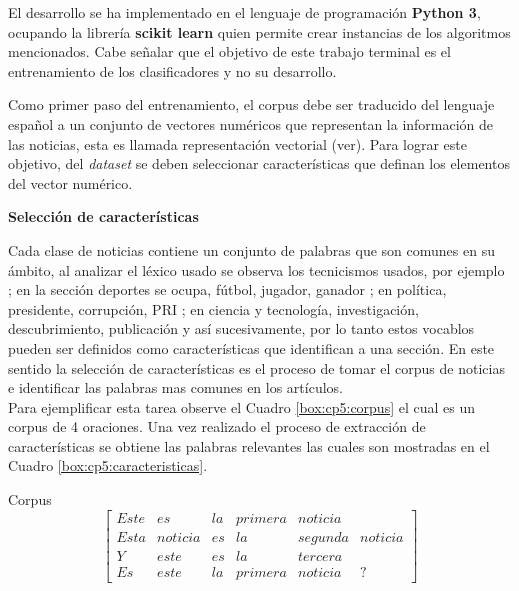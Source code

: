 El desarrollo se ha implementado en el lenguaje de programación \textbf{Python 3}, ocupando la librería \textbf{scikit learn} quien permite crear instancias de los algoritmos mencionados. Cabe señalar que el objetivo de este trabajo terminal es el entrenamiento de los clasificadores y no su desarrollo.

Como primer paso del entrenamiento, el corpus debe ser traducido del lenguaje español a un conjunto de vectores numéricos que representan la información de las noticias, esta es llamada representación vectorial (ver). Para lograr este objetivo, del \textit{dataset} se deben seleccionar características que definan los elementos del vector numérico.\\

\begin{large}
\textbf{Selección de características}\\
\end{large}

Cada clase de noticias contiene un conjunto de palabras que son comunes en su ámbito, al analizar el léxico usado se observa los tecnicismos usados, por ejemplo ; en la sección deportes se ocupa, fútbol, jugador, ganador ; en política, presidente, corrupción, PRI ; en ciencia y tecnología, investigación, descubrimiento, publicación y así sucesivamente, por lo tanto estos vocablos pueden ser definidos como características que identifican a una sección. En este sentido la selección de características es el proceso de tomar el corpus de noticias e identificar las palabras mas comunes en los artículos.\\ 

Para ejemplificar esta tarea observe el Cuadro \ref{box:cp5:corpus} el cual es un corpus de 4 oraciones. Una vez realizado el proceso de extracción de características se obtiene las palabras relevantes las cuales son mostradas en el Cuadro \ref{box:cp5:caracteristicas}.\\

\begin{mygraybox}[label={box:cp5:corpus}]{Corpus} 
\begin{equation*}
\begin{bmatrix}
Este&es&la&primera&noticia\\
Esta&noticia&es&la&segunda&noticia\\
Y&este&es&la&tercera\\
Es&este&la&primera&noticia&?
\end{bmatrix}
\end{equation*}
\end{mygraybox}

